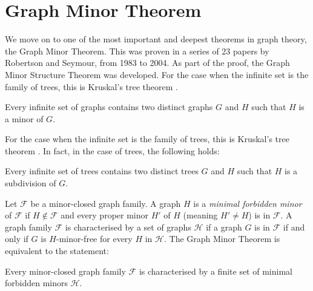 \section{Graph Minor Theorem}\label{sec:Graph Minor Theorem}
We move on to one of the most important and deepest theorems in graph theory, the Graph Minor Theorem. This was proven in a series of 23 papers by Robertson and Seymour, from 1983 to 2004. As part of the proof, the Graph Minor Structure Theorem was developed. For the case when the infinite set is the family of trees, this is Kruskal's tree theorem \cite{kruskalWellQuasiOrderingTreeTheorem1960}. 
\begin{theorem}
	Every infinite set of graphs contains two distinct graphs \(G\) and \(H\) such that \(H\) is a minor of \(G\).
\end{theorem}
For the case when the infinite set is the family of trees, this is Kruskal's tree theorem \cite{kruskalWellQuasiOrderingTreeTheorem1960}. In fact, in the case of trees, the following holds:
\begin{theorem}
	Every infinite set of trees contains two distinct trees \(G\) and \(H\) such that \(H\) is a subdivision of \(G\).
\end{theorem}
Let $\mathcal{F}$ be a minor-closed graph family. A graph $H$ is a \textit{minimal forbidden minor} of $\mathcal{F}$ if $H \notin \mathcal{F}$ and every proper minor $H'$ of $H$ (meaning $H' \neq H$) is in $\mathcal{F}$. A graph family $\mathcal{F}$ is characterised by a set of graphs $\mathcal{H}$ if a graph $G$ is in $\mathcal{F}$ if and only if $G$ is $H$-minor-free for every $H$ in $\mathcal{H}$. 
The Graph Minor Theorem is equivalent to the statement:
\begin{theorem}
	Every minor-closed graph family $\mathcal{F}$ is characterised by a finite set of minimal forbidden minors $\mathcal{H}$. 
\end{theorem}

